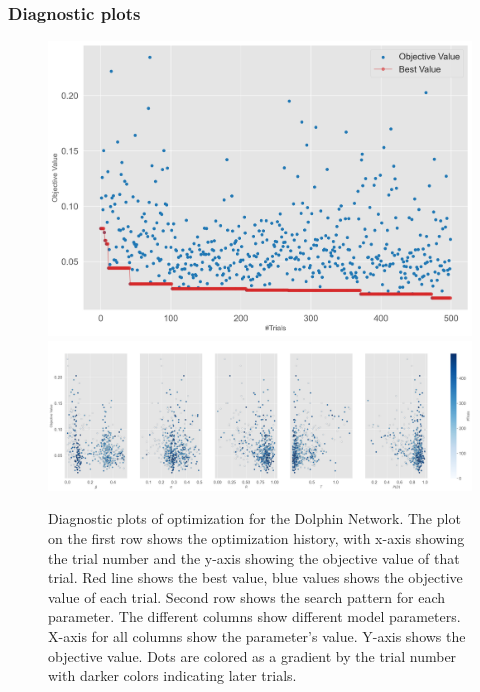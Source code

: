 \documentclass[11pt]{article}
\begin{document}
\subsubsection{Diagnostic plots}
\begin{figure}[H]
    \centering
    \includegraphics[width=.7\linewidth]{../plots/overall/Optimization_History_dolphin.png}
    \includegraphics[width=.7\linewidth]{../plots/overall/Plot_Slice_dolphin.png}
  \caption{Diagnostic plots of optimization for the Dolphin Network. The plot on the first row shows the optimization history, with x-axis showing the trial number and the y-axis showing the objective value of that trial. Red line shows the best value, blue values shows the objective value of each trial. Second row shows the search pattern for each parameter. The different columns show different model parameters. X-axis for all columns show the parameter's value. Y-axis shows the objective value. Dots are colored as a gradient by the trial number with darker colors indicating later trials.}
  \label{appendix:optimization_dolphin}
\end{figure}
\end{document}
